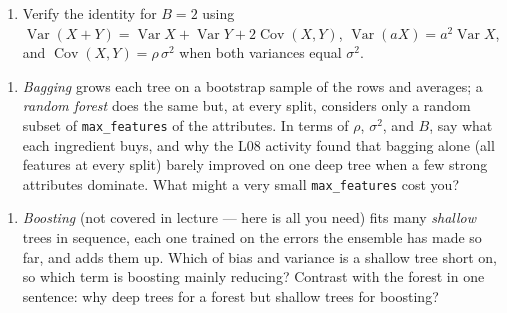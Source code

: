 \documentclass[
  11pt,
]{article}
\providecommand{\tightlist}{%
  \setlength{\itemsep}{0pt}\setlength{\parskip}{0pt}}
\newcommand{\answerspace}[1]{\par\vspace*{#1}}  %
\newcommand{\answerpage}{\clearpage}
\begin{document}
\answerspace{1.5in}

\begin{enumerate}
\def\labelenumi{(\alph{enumi})}
\setcounter{enumi}{1}
\tightlist
\item
  Verify the identity for \(B = 2\) using
  \(\operatorname{Var}(X+Y) = \operatorname{Var}X + \operatorname{Var}Y + 2\operatorname{Cov}(X,Y)\),
  \(\operatorname{Var}(aX) = a^2\operatorname{Var}X\), and
  \(\operatorname{Cov}(X,Y) = \rho\,\sigma^2\) when both variances equal
  \(\sigma^2\).
\end{enumerate}

\answerspace{2in}
\answerpage

\begin{enumerate}
\def\labelenumi{(\alph{enumi})}
\setcounter{enumi}{2}
\tightlist
\item
  \emph{Bagging} grows each tree on a bootstrap sample of the rows and
  averages; a \emph{random forest} does the same but, at every split,
  considers only a random subset of \texttt{max\_features} of the
  attributes. In terms of \(\rho\), \(\sigma^2\), and \(B\), say what
  each ingredient buys, and why the L08 activity found that bagging
  alone (all features at every split) barely improved on one deep tree
  when a few strong attributes dominate. What might a very small
  \texttt{max\_features} cost you?
\end{enumerate}

\answerspace{2.2in}

\begin{enumerate}
\def\labelenumi{(\alph{enumi})}
\setcounter{enumi}{3}
\tightlist
\item
  \emph{Boosting} (not covered in lecture --- here is all you need) fits
  many \emph{shallow} trees in sequence, each one trained on the errors
  the ensemble has made so far, and adds them up. Which of bias and
  variance is a shallow tree short on, so which term is boosting mainly
  reducing? Contrast with the forest in one sentence: why deep trees for
  a forest but shallow trees for boosting?
\end{enumerate}

\answerspace{1.8in}
\end{document}
